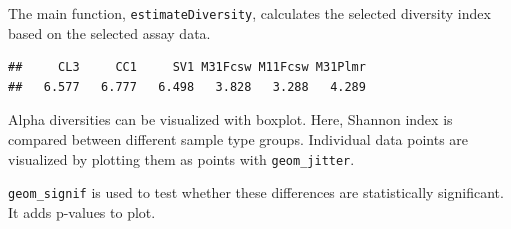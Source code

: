 \documentclass[
]{book}
\newenvironment{Shaded}{\begin{snugshade}}{\end{snugshade}}
\newcommand{\AttributeTok}[1]{\textcolor[rgb]{0.77,0.63,0.00}{#1}}
\newcommand{\FunctionTok}[1]{\textcolor[rgb]{0.00,0.00,0.00}{#1}}
\newcommand{\NormalTok}[1]{#1}
\newcommand{\OtherTok}[1]{\textcolor[rgb]{0.56,0.35,0.01}{#1}}
\newcommand{\SpecialCharTok}[1]{\textcolor[rgb]{0.00,0.00,0.00}{#1}}
\newcommand{\StringTok}[1]{\textcolor[rgb]{0.31,0.60,0.02}{#1}}
\begin{document}
The main function, \texttt{estimateDiversity}, calculates the selected
diversity index based on the selected assay data.

\begin{Shaded}
\end{Shaded}

\begin{verbatim}
##     CL3     CC1     SV1 M31Fcsw M11Fcsw M31Plmr 
##   6.577   6.777   6.498   3.828   3.288   4.289
\end{verbatim}

Alpha diversities can be visualized with boxplot. Here, Shannon index is compared
between different sample type groups. Individual data points are visualized by
plotting them as points with \texttt{geom\_jitter}.

\texttt{geom\_signif} is used to test whether these differences are statistically significant.
It adds p-values to plot.
\end{document}
